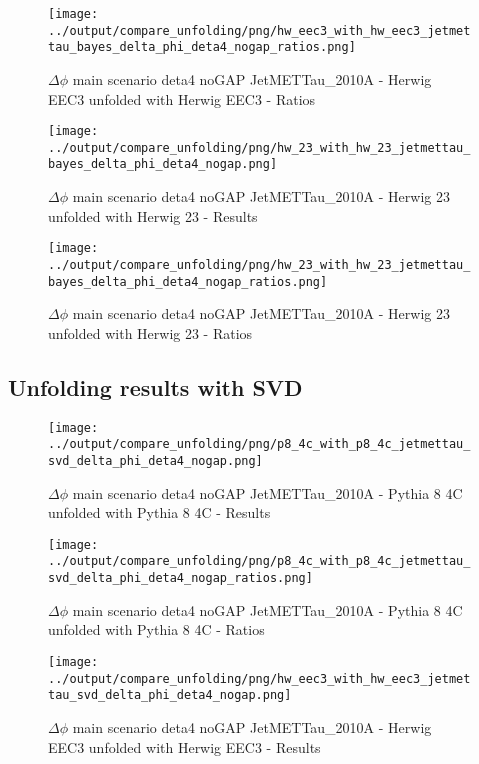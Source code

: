 \documentclass[11pt]{book}
\begin{document}
\begin{figure}[ht]
\centering
\texttt{[image: ../output/compare\_unfolding/png/hw\_eec3\_with\_hw\_eec3\_jetmettau\_bayes\_delta\_phi\_deta4\_nogap\_ratios.png]}
\caption{$\Delta\phi$ main scenario deta4 noGAP JetMETTau\_2010A - Herwig EEC3 unfolded with Herwig EEC3 - Ratios}
\label{hw_eec3_hw_eec3_jetmettau_bayes_delta_phi_deta4_nogap_b}
\end{figure}

\begin{figure}[ht]
\centering
\texttt{[image: ../output/compare\_unfolding/png/hw\_23\_with\_hw\_23\_jetmettau\_bayes\_delta\_phi\_deta4\_nogap.png]}
\caption{$\Delta\phi$ main scenario deta4 noGAP JetMETTau\_2010A - Herwig 23 unfolded with Herwig 23 - Results}
\label{hw_23_hw_23_jetmettau_bayes_delta_phi_deta4_nogap_a}
\end{figure}

\begin{figure}[ht]
\centering
\texttt{[image: ../output/compare\_unfolding/png/hw\_23\_with\_hw\_23\_jetmettau\_bayes\_delta\_phi\_deta4\_nogap\_ratios.png]}
\caption{$\Delta\phi$ main scenario deta4 noGAP JetMETTau\_2010A - Herwig 23 unfolded with Herwig 23 - Ratios}
\label{hw_23_hw_23_jetmettau_bayes_delta_phi_deta4_nogap_b}
\end{figure}

\clearpage
\subsection{Unfolding results with SVD}

\begin{figure}[ht]
\centering
\texttt{[image: ../output/compare\_unfolding/png/p8\_4c\_with\_p8\_4c\_jetmettau\_svd\_delta\_phi\_deta4\_nogap.png]}
\caption{$\Delta\phi$ main scenario deta4 noGAP JetMETTau\_2010A - Pythia 8 4C unfolded with Pythia 8 4C - Results}
\label{p8_p8_jetmettau_svd_delta_phi_deta4_nogap_a}
\end{figure}

\begin{figure}[ht]
\centering
\texttt{[image: ../output/compare\_unfolding/png/p8\_4c\_with\_p8\_4c\_jetmettau\_svd\_delta\_phi\_deta4\_nogap\_ratios.png]}
\caption{$\Delta\phi$ main scenario deta4 noGAP JetMETTau\_2010A - Pythia 8 4C unfolded with Pythia 8 4C - Ratios}
\label{p8_p8_jetmettau_svd_delta_phi_deta4_nogap_b}
\end{figure}

\begin{figure}[ht]
\centering
\texttt{[image: ../output/compare\_unfolding/png/hw\_eec3\_with\_hw\_eec3\_jetmettau\_svd\_delta\_phi\_deta4\_nogap.png]}
\caption{$\Delta\phi$ main scenario deta4 noGAP JetMETTau\_2010A - Herwig EEC3 unfolded with Herwig EEC3 - Results}
\label{hw_eec3_hw_eec3_jetmettau_svd_delta_phi_deta4_nogap_a}
\end{figure}
\end{document}
